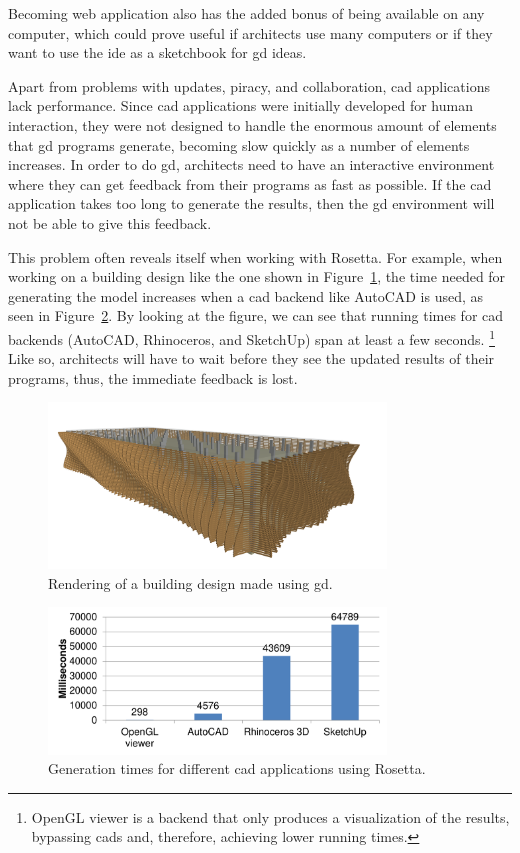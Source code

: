 Becoming web application also has the added bonus of being available on any computer, which could prove useful if architects use many computers or if they want to use the \gls{ide} as a sketchbook for \gls{gd} ideas.

Apart from problems with updates, piracy, and collaboration, \gls{cad} applications lack performance.
Since \gls{cad} applications were initially developed for human interaction, they were not designed to handle the enormous amount of elements that \gls{gd} programs generate, becoming slow quickly as a number of elements increases.
In order to do \gls{gd}, architects need to have an interactive environment where they can get feedback from their programs as fast as possible.
If the \gls{cad} application takes too long to generate the results, then the \gls{gd} environment will not be able to give this feedback.

This problem often reveals itself when working with Rosetta.
For example, when working on a building design like the one shown in Figure~\ref{fig:carmo:render}, the time needed for generating the model increases when a \gls{cad} backend like AutoCAD is used, as seen in Figure~\ref{fig:carmo:times}.
By looking at the figure, we can see that running times for \gls{cad} backends (AutoCAD, Rhinoceros, and SketchUp) span at least a few seconds.%
\footnote{OpenGL viewer is a backend that only produces a visualization of the results, bypassing \glspl{cad} and, therefore, achieving lower running times.}
Like so, architects will have to wait before they see the updated results of their programs, thus, the immediate feedback is lost.

\begin{figure}
	\centering
	\includegraphics[width=0.8\textwidth]{images/carmo_render}
	\caption{Rendering of a building design made using \gls{gd}.}
	\label{fig:carmo:render}
\end{figure}

\begin{figure}
	\centering
	\includegraphics[width=0.8\textwidth]{images/carmo_rosetta_times/carmo_rosetta_times}
	\caption{Generation times for different \gls{cad} applications using Rosetta.}
	\label{fig:carmo:times}
\end{figure}



